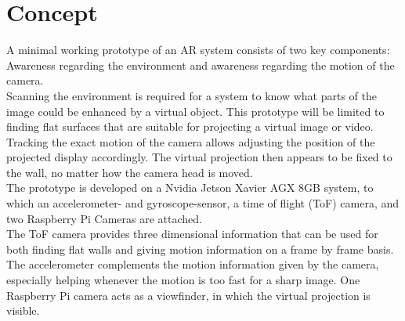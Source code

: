 \chapter{Concept}
\label{sec:Concept}
A minimal working prototype of an AR system consists of two key components: Awareness regarding the environment and awareness regarding the motion of the camera.\\
Scanning the environment is required for a system to know what parts of the image could be enhanced by a virtual object. This prototype will be limited to finding flat surfaces that are suitable for projecting a virtual image or video. \\
Tracking the exact motion of the camera allows adjusting the position of the projected display accordingly. The virtual projection then appears to be fixed to the wall, no matter how the camera head is moved.\\ 
The prototype is developed on a Nvidia Jetson Xavier AGX 8GB system, to which an accelerometer- and gyroscope-sensor, a time of flight (ToF) camera, and two Raspberry Pi Cameras are attached.\\
The ToF camera provides three dimensional information that can be used for both finding flat walls and giving motion information on a frame by frame basis. The accelerometer complements the motion information given by the camera, especially helping whenever the motion is too fast for a sharp image. One Raspberry Pi camera acts as a viewfinder, in which the virtual projection is visible.\\




